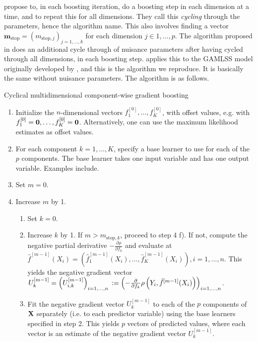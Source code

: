 \citet{schmid} propose to, in each boosting iteration, do a boosting step in each dimension at a time, and to repeat this for all dimensions. They call this \textit{cycling} through the parameters, hence the algorithm name. This also involves finding a vector $\mathbf{m}_{\text{stop}}=(m_{\text{stop},j})_{j=1,\ldots,k}$ for each dimension $j\in1,\ldots,p$. The algorithm proposed in \citet{schmid} does an additional cycle through of nuisance parameters after having cycled through all dimensions, in each boosting step. \citet{gamboostlss-paper} applies this to the GAMLSS model originally developed by \citet{gamlss}, and this is the algorithm we reproduce. It is basically the same without nuisance parameters. The algorithm is as follows.
\begin{algorithm}
\caption{Cyclical multidimensional component-wise gradient boosting}
\label{algo:multidim-boost}
\begin{enumerate}
    \item Initialize the $n$-dimensional vectors $f_1^{[0]},\ldots,f_K^{[0]}$, with offset values, e.g. with $f_1^{[0]}=\mathbf{0},\ldots,f_K^{[0]}=\mathbf{0}$. Alternatively, one can use the maximum likelihood estimates as offset values.
    \item For each component $k=1,\ldots,K$, specify a base learner to use for each of the $p$ components. The base learner takes one input variable and has one output variable. Examples include.
    \item Set $m=0$.
    \item Increase $m$ by 1.
    \begin{enumerate}
        \item Set $k=0$.
        \item Increase $k$ by 1. If $m>m_{\text{stop},k}$, proceed to step 4 f). If not, compute the negative partial derivative $-\frac{\partial\rho}{\partial f_k}$ and evaluate at $\hat{f}^{[m-1]}(X_i)=\left(\hat{f}_1^{[m-1]}(X_i),\ldots,\hat{f}_K^{[m-1]}(X_i)\right),i=1,\ldots,n$. This yields the negative gradient vector $U_k^{[m-1]}=\left(U_{i,k}^{[m-1]}\right)_{i=1,\ldots,n}
        \newline:=\left(-\frac{\partial}{\partial f_k}\rho\left(Y_i,\hat{f}^{[m-1]}(X_i)\right)\right)_{i=1,\ldots,n}$.
        \item Fit the negative gradient vector $U_k^{[m-1]}$ to each of the $p$ components of $\mathbf{X}$ separately (i.e. to each predictor variable) using the base learners specified in step 2. This yields $p$ vectors of predicted values, where each vector is an estimate of the negative gradient vector $U_k^{[m-1]}$.

\end{enumerate}
\end{enumerate}
\end{algorithm}
